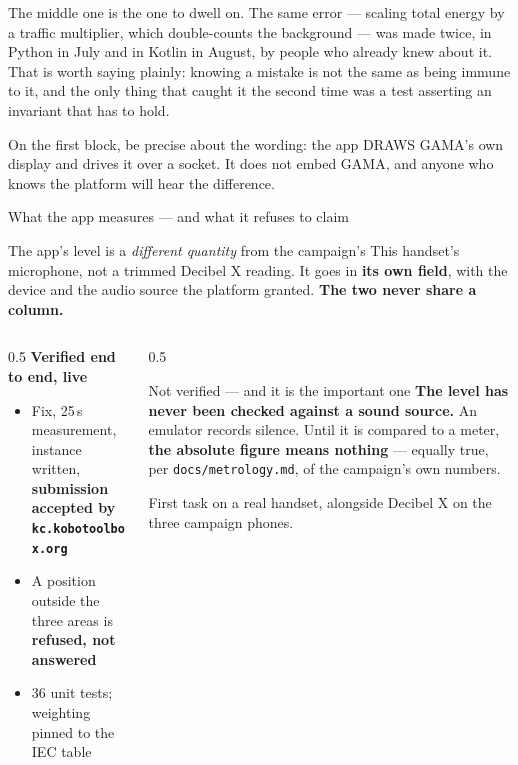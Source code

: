 \documentclass[aspectratio=169,10pt]{beamer}
\newcommand{\aside}[1]{{\scriptsize\color{muted}#1}}
\newcommand{\up}[1]{\textcolor{good}{\textbf{#1}}}
\begin{document}
{{The middle one is the one to dwell on. The same error --- scaling total energy by
a traffic multiplier, which double-counts the background --- was made twice, in
Python in July and in Kotlin in August, by people who already knew about it. That
is worth saying plainly: knowing a mistake is not the same as being immune to it,
and the only thing that caught it the second time was a test asserting an
invariant that has to hold.

On the first block, be precise about the wording: the app DRAWS GAMA's own
display and drives it over a socket. It does not embed GAMA, and anyone who
knows the platform will hear the difference.}
}%


\begin{frame}{What the app measures --- and what it refuses to claim}
  \begin{alertblock}{The app's level is a \emph{different quantity} from the campaign's}
    This handset's microphone, not a trimmed Decibel X reading. It goes in
    \textbf{its own field}, with the device and the audio source the platform
    granted. \textbf{The two never share a column.}
  \end{alertblock}
  \vspace{.2em}
  \begin{columns}[T]
    \begin{column}{0.5\textwidth}
      \textbf{Verified end to end, live}
      \begin{itemize}
        \item Fix, 25\,s measurement, instance written, \up{submission accepted
              by \texttt{kc.kobotoolbox.org}}
        \item A position outside the three areas is \textbf{refused, not
              answered}
        \item 36 unit tests; weighting pinned to the IEC table
      \end{itemize}
    \end{column}
    \begin{column}{0.5\textwidth}
      \begin{alertblock}{Not verified --- and it is the important one}
        \textbf{The level has never been checked against a sound source.} An
        emulator records silence. Until it is compared to a meter, \textbf{the
        absolute figure means nothing} --- equally true, per
        \texttt{docs/metrology.md}, of the campaign's own numbers.
      \end{alertblock}
      \aside{First task on a real handset, alongside Decibel X on the three
      campaign phones.}
    \end{column}
  \end{columns}
\end{frame}
\end{document}
